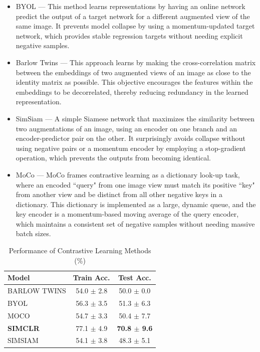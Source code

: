 \begin{itemize}
    \item BYOL \citep{Grill2020} --- This method learns representations by having an online network predict the output of a target network for a different augmented view of the same image. It prevents model collapse by using a momentum-updated target network, which provides stable regression targets without needing explicit negative samples.

    \item Barlow Twins \citep{Zbontar2021} --- This approach learns by making the cross-correlation matrix between the embeddings of two augmented views of an image as close to the identity matrix as possible. This objective encourages the features within the embeddings to be decorrelated, thereby reducing redundancy in the learned representation.

    \item SimSiam \citep{Chen2021} --- A simple Siamese network that maximizes the similarity between two augmentations of an image, using an encoder on one branch and an encoder-predictor pair on the other. It surprisingly avoids collapse without using negative pairs or a momentum encoder by employing a stop-gradient operation, which prevents the outputs from becoming identical.

    \item MoCo \citep{He2020} --- MoCo frames contrastive learning as a dictionary look-up task, where an encoded ``query" from one image view must match its positive ``key" from another view and be distinct from all other negative keys in a dictionary. This dictionary is implemented as a large, dynamic queue, and the key encoder is a momentum-based moving average of the query encoder, which maintains a consistent set of negative samples without needing massive batch sizes.
\end{itemize}



\begin{table}[t]
    \centering
    \caption{Performance of Contrastive Learning Methods (\%)}
    \label{tab:contrastive_performance_percent}
    \begin{tabular}{|l|c|c|}
        \hline
        Model & Train Acc. & Test Acc. \\
        \hline
        BARLOW TWINS & 54.0 $\pm$ 2.8 & 50.0 $\pm$ 0.0 \\
        BYOL & 56.3 $\pm$ 3.5 & 51.3 $\pm$ 6.3 \\
        MOCO & 54.7 $\pm$ 3.3 & 50.4 $\pm$ 7.7 \\
        \textbf{SIMCLR} & 77.1 $\pm$ 4.9 & \textbf{70.8 $\pm$ 9.6} \\
        SIMSIAM & 54.1 $\pm$ 3.8 & 48.3 $\pm$ 5.1 \\
        \hline
    \end{tabular}
\end{table}

